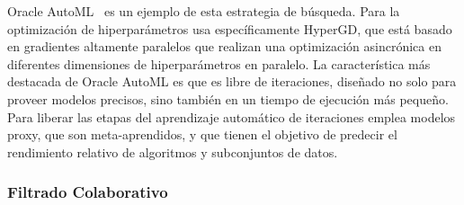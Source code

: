 Oracle AutoML~\cite{OracleAutoML} es un ejemplo de esta estrategia de búsqueda. Para la optimización de hiperparámetros usa específicamente HyperGD, que está basado en gradientes altamente paralelos que realizan una optimización asincrónica en diferentes dimensiones de hiperparámetros en paralelo. La característica más destacada de Oracle AutoML es que es libre de iteraciones, diseñado no solo para proveer modelos precisos, sino también en un tiempo de ejecución más pequeño. Para liberar las etapas del aprendizaje automático de iteraciones emplea modelos proxy, que son meta-aprendidos, y que tienen el objetivo de predecir el rendimiento relativo de algoritmos y subconjuntos de datos. %

\subsubsection{Filtrado Colaborativo}


